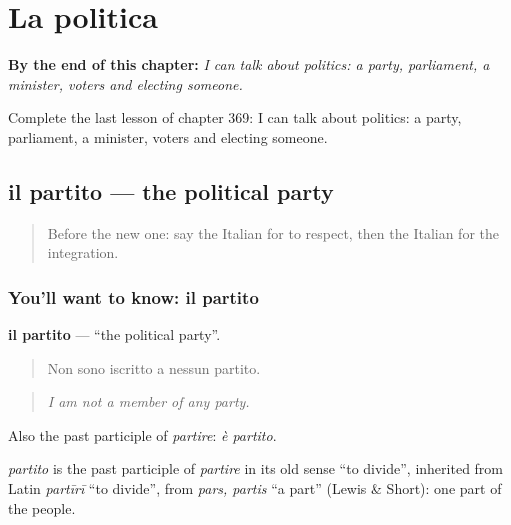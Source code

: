 
\chapter{La politica}
\label{ch:it-la-politica}

\begin{chapteropening}
\textbf{By the end of this chapter:} \emph{I can talk about politics: a party, parliament, a minister, voters and electing someone.}

Complete the last lesson of chapter 369: I can talk about politics: a party, parliament, a minister, voters and electing someone.
\end{chapteropening}

\section[il partito]{il partito — the political party}

\label{lesson:IT-C369-partito}



\begin{quote}
Before the new one: say the Italian for to respect, then the Italian for the integration.
\end{quote}

\subsection*{You'll want to know: il partito}
\textbf{il partito} — \textquotedblleft{}the political party\textquotedblright{}.

\begin{quote}
Non sono iscritto a nessun partito.
\end{quote}

\begin{quote}
\emph{I am not a member of any party.}
\end{quote}

Also the past participle of \emph{partire}: \emph{è partito}.

\begin{cousinweb}
\emph{partito} is the past participle of \emph{partire} in its old sense \textquotedblleft{}to divide\textquotedblright{}, inherited from Latin \emph{partīrī} \textquotedblleft{}to divide\textquotedblright{}, from \emph{pars, partis} \textquotedblleft{}a part\textquotedblright{} (Lewis \& Short): one part of the people.
\end{cousinweb}

